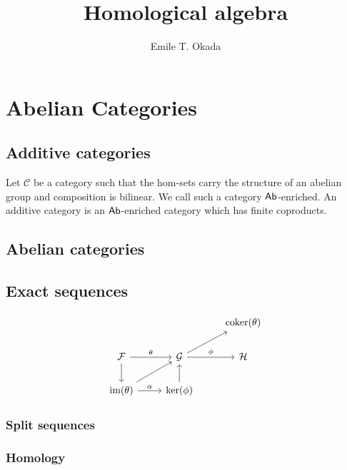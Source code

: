 \documentclass{memoir}
\title{Homological algebra}
\author{Emile T. Okada}
\begin{document}
\maketitle
\tableofcontents
\chapter{Abelian Categories}
\section{Additive categories}
Let $\mathcal C$ be a category such that the hom-sets carry the structure of an abelian group and composition is bilinear. We call such a category ${\normalfont\mathsf{Ab}}$-enriched.
An additive category is an ${\normalfont\mathsf{Ab}}$-enriched category which has finite coproducts.
\section{Abelian categories}
\section{Exact sequences}
\label{sec:es}
\begin{equation}
    \begin{tikzcd}
        & & \coker(\theta) \\
        \mathcal F \arrow[r,"\theta"] \arrow[d] & \mathcal G \arrow[r,"\phi"] \arrow[ur] & \mathcal H \\
        \im(\theta) \arrow[r,"\alpha"] \arrow[ur] & \ker(\phi) \arrow[u] &
    \end{tikzcd}
\end{equation}
\subsection{Split sequences}
\subsection{Homology}
\end{document}
